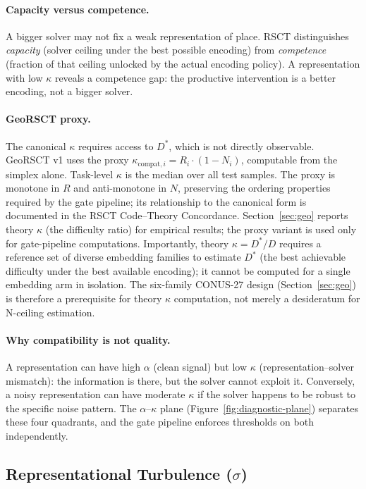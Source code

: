 \documentclass{article}
\begin{document}
\paragraph{Capacity versus competence.} A bigger solver may not fix a weak representation of place. RSCT distinguishes \emph{capacity} (solver ceiling under the best possible encoding) from \emph{competence} (fraction of that ceiling unlocked by the actual encoding policy). A representation with low $\kappa$ reveals a competence gap: the productive intervention is a better encoding, not a bigger solver.

\paragraph{GeoRSCT proxy.} The canonical $\kappa$ requires access to $D^*$, which is not directly observable. GeoRSCT v1 uses the proxy $\kappa_{\text{compat},i} = R_i \cdot (1 - N_i)$, computable from the simplex alone. Task-level $\kappa$ is the median over all test samples. The proxy is monotone in $R$ and anti-monotone in $N$, preserving the ordering properties required by the gate pipeline; its relationship to the canonical form is documented in the RSCT Code--Theory Concordance. Section~\ref{sec:geo} reports theory $\kappa$ (the difficulty ratio) for empirical results; the proxy variant is used only for gate-pipeline computations. Importantly, theory $\kappa = D^*/D$ requires a reference set of diverse embedding families to estimate $D^*$ (the best achievable difficulty under the best available encoding); it cannot be computed for a single embedding arm in isolation. The six-family CONUS-27 design (Section~\ref{sec:geo}) is therefore a prerequisite for theory $\kappa$ computation, not merely a desideratum for N-ceiling estimation.

\paragraph{Why compatibility is not quality.} A representation can have high $\alpha$ (clean signal) but low $\kappa$ (representation--solver mismatch): the information is there, but the solver cannot exploit it. Conversely, a noisy representation can have moderate $\kappa$ if the solver happens to be robust to the specific noise pattern. The $\alpha$--$\kappa$ plane (Figure~\ref{fig:diagnostic-plane}) separates these four quadrants, and the gate pipeline enforces thresholds on both independently.

\subsection{\texorpdfstring{Representational Turbulence ($\sigma$)}{Representational Turbulence (sigma)}}
\end{document}
